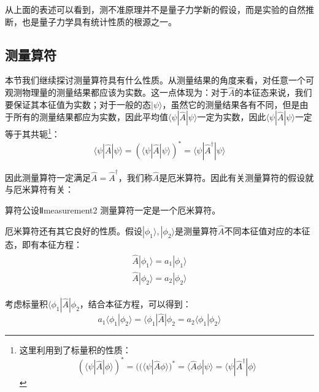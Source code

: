         \begin{remark}
            从上面的表述可以看到，测不准原理并不是量子力学新的假设，而是实验的自然推断，也是量子力学具有统计性质的根源之一。
        \end{remark}
    \subsection{测量算符}
        本节我们继续探讨测量算符具有什么性质。从测量结果的角度来看，对任意一个可观测物理量的测量结果都应该为实数。这一点体现为：对于$\hat{A}$的本征态来说，我们要保证其本征值为实数；对于一般的态$|\psi\rangle$，虽然它的测量结果各有不同，但是由于所有的测量结果都应为实数，因此平均值$\langle\psi|\hat{A}|\psi\rangle$一定为实数，因此$\langle\psi|\hat{A}|\psi\rangle$一定等于其共轭\footnote{这里利用到了标量积的性质：
        \begin{equation*}
            (\langle\psi|\hat{A}|\phi\rangle)^*=( (\langle\psi|\hat{A}\phi\rangle)^*=\langle\hat{A}\phi|\psi\rangle=\langle\psi|\hat{A}^\dagger|\phi\rangle
        \end{equation*}}：
        \begin{equation}
            \langle \psi|\hat{A}|\psi\rangle=(\langle\psi|\hat{A}|\psi\rangle)^*=\langle\psi|\hat{A}^\dagger|\psi\rangle
        \end{equation}
        
        因此测量算符一定满足$\hat{A}=\hat{A}^\dagger$，我们称$\hat{A}$是厄米算符。因此有关测量算符的假设就与厄米算符有关：
        \begin{definition}{算符公设Ⅱ}{measurement2}
            测量算符一定是一个厄米算符。
        \end{definition}
        
        厄米算符还有其它良好的性质。假设$|\phi_1\rangle,|\phi_2\rangle$是测量算符$\hat{A}$不同本征值对应的本征态，即有本征方程：
        \begin{align}
            \begin{split}
                \hat{A}|\phi_1\rangle=a_1|\phi_1\rangle\\
                \hat{A}|\phi_2\rangle=a_2|\phi_2\rangle
            \end{split}
        \end{align}
        
        考虑标量积$\langle\phi_1|\hat{A}|\phi_2$，结合本征方程，可以得到：
        \begin{equation}
            a_1\langle\phi_1|\phi_2\rangle=\langle\phi_1|\hat{A}|\phi_2=a_2\langle\phi_1|\phi_2\rangle
        \end{equation}
        

